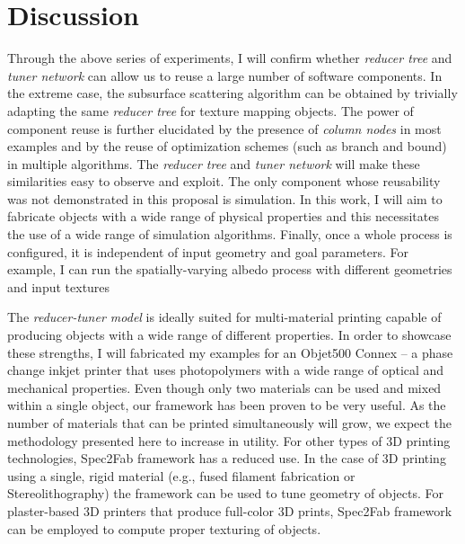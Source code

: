 \chapter{Discussion}
Through the above series of experiments, I will confirm whether \emph{reducer tree} and \emph{tuner network} can allow us to reuse a large number of software components.
In the extreme case, the subsurface scattering algorithm can be obtained by trivially adapting the same \emph{reducer tree} for texture mapping objects.
The power of component reuse is further elucidated by the presence of \emph{column nodes} in most examples and by the reuse of optimization schemes (such as branch and bound) in multiple algorithms.
The \emph{reducer tree} and \emph{tuner network} will make these similarities easy to observe and exploit.
The only component whose reusability was not demonstrated in this proposal is simulation.
In this work, I will aim to fabricate objects with a wide range of physical properties and this necessitates the use of a wide range of simulation algorithms. Finally, once a whole process is configured, it is independent of input geometry and goal parameters. For example, I can run the spatially-varying albedo process with different geometries and input textures

The \emph{reducer-tuner model} is ideally suited for multi-material printing capable of producing objects with a wide range of different properties.
In order to showcase these strengths, I will fabricated my examples for an Objet500 Connex -- a phase change inkjet printer that uses photopolymers with a wide range of optical and mechanical properties. Even though only two materials can be used and mixed within a single object, our framework has been proven to be very useful. 
As the number of materials that can be printed simultaneously will grow, we expect the methodology presented here to increase in utility.
For other types of 3D printing technologies, Spec2Fab framework has a reduced use. In the case of 3D printing using a single, rigid material (e.g., fused filament fabrication or Stereolithography) the framework can be used to tune geometry of objects. For plaster-based 3D printers that produce full-color 3D prints, Spec2Fab framework can be employed to compute proper texturing of objects.
